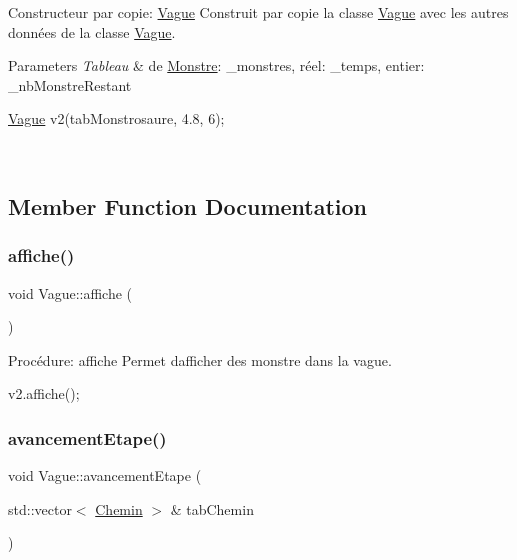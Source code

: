 Constructeur par copie\+: \hyperlink{classVague}{Vague} Construit par copie la classe \hyperlink{classVague}{Vague} avec les autres données de la classe \hyperlink{classVague}{Vague}. 


\begin{DoxyParams}{Parameters}
{\em Tableau} & de \hyperlink{classMonstre}{Monstre}\+: \+\_\+monstres, réel\+: \+\_\+temps, entier\+: \+\_\+nb\+Monstre\+Restant 
\begin{DoxyCode}
\hyperlink{classVague}{Vague} v2(tabMonstrosaure, 4.8, 6);
\end{DoxyCode}
 \\
\hline
\end{DoxyParams}


\subsection{Member Function Documentation}
\mbox{\label{classVague_adec201ad91a86f65bf6aaf0ddb73bd20}} 
\subsubsection{\texorpdfstring{affiche()}{affiche()}}
{\footnotesize\ttfamily void Vague\+::affiche (\begin{DoxyParamCaption}{ }\end{DoxyParamCaption})}



Procédure\+: affiche Permet d\textquotesingle{}afficher des monstre dans la vague. 


\begin{DoxyCode}
v2.affiche();
\end{DoxyCode}
 \mbox{\label{classVague_ab61cff7242c22ec90c6cb4858b5a0bc6}} 
\subsubsection{\texorpdfstring{avancement\+Etape()}{avancementEtape()}}
{\footnotesize\ttfamily void Vague\+::avancement\+Etape (\begin{DoxyParamCaption}\item[{std\+::vector$<$ \hyperlink{classChemin}{Chemin} $>$ \&}]{tab\+Chemin }\end{DoxyParamCaption})}



